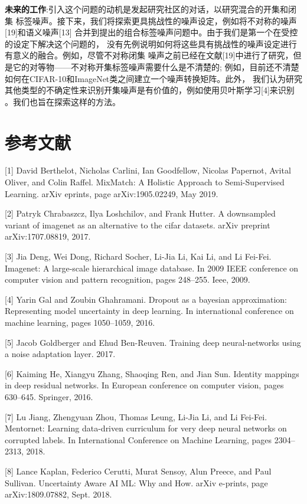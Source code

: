 \documentclass[11pt]{article}
\begin{document}
\textbf{未来的工作}:引入这个问题的动机是发起研究社区的对话，以研究混合的开集和闭集
标签噪声。接下来，我们将探索更具挑战性的噪声设定，例如将不对称的噪声[19]和语义噪声[13]
合并到提出的组合标签噪声问题中。由于我们是第一个在受控的设定下解决这个问题的，
没有先例说明如何将这些具有挑战性的噪声设定进行有意义的融合。例如，尽管不对称闭集
噪声之前已经在文献[19]中进行了研究，但是它的对等物——不对称开集标签噪声需要什么是不清楚的;
例如，目前还不清楚如何在CIFAR-10和ImageNet类之间建立一个噪声转换矩阵。此外，
我们认为研究其他类型的不确定性来识别开集噪声是有价值的，例如使用贝叶斯学习[4]来识别
。我们也旨在探索这样的方法。

\section{参考文献}
[1] David Berthelot, Nicholas Carlini, Ian Goodfellow, Nicolas
Papernot, Avital Oliver, and Colin Raffel. MixMatch: A
Holistic Approach to Semi-Supervised Learning. arXiv eprints,
page arXiv:1905.02249, May 2019.

[2] Patryk Chrabaszcz, Ilya Loshchilov, and Frank Hutter. A
downsampled variant of imagenet as an alternative to the cifar
datasets. arXiv preprint arXiv:1707.08819, 2017.

[3] Jia Deng, Wei Dong, Richard Socher, Li-Jia Li, Kai Li,
and Li Fei-Fei. Imagenet: A large-scale hierarchical image
database. In 2009 IEEE conference on computer vision and
pattern recognition, pages 248–255. Ieee, 2009.

[4] Yarin Gal and Zoubin Ghahramani. Dropout as a bayesian
approximation: Representing model uncertainty in deep
learning. In international conference on machine learning,
pages 1050–1059, 2016.

[5] Jacob Goldberger and Ehud Ben-Reuven. Training deep
neural-networks using a noise adaptation layer. 2017.

[6] Kaiming He, Xiangyu Zhang, Shaoqing Ren, and Jian Sun.
Identity mappings in deep residual networks. In European
conference on computer vision, pages 630–645. Springer,
2016.

[7] Lu Jiang, Zhengyuan Zhou, Thomas Leung, Li-Jia Li, and
Li Fei-Fei. Mentornet: Learning data-driven curriculum for
very deep neural networks on corrupted labels. In International
Conference on Machine Learning, pages 2304–2313,
2018.

[8] Lance Kaplan, Federico Cerutti, Murat Sensoy, Alun Preece,
and Paul Sullivan. Uncertainty Aware AI ML: Why and
How. arXiv e-prints, page arXiv:1809.07882, Sept. 2018.
\end{document}
